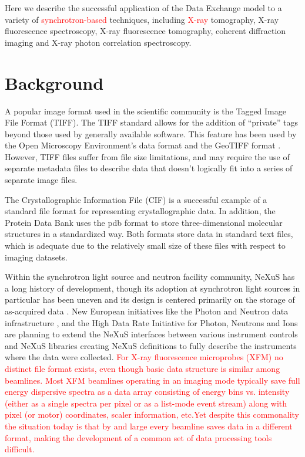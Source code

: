 \documentclass[pdf]{iucr}              %
\begin{document}
Here we describe the successful application of the Data Exchange model to a variety of \textcolor{red}{synchrotron-based} techniques, including \textcolor{red}{X-ray} tomography, X-ray fluorescence spectroscopy, X-ray fluorescence tomography, coherent diffraction imaging and X-ray photon correlation spectroscopy.

\section{Background}

A popular image format used in the scientific community is the Tagged Image File Format (TIFF). The TIFF standard allows for the addition of ``private'' tags beyond those used by generally available software. This feature has been used by the Open Microscopy Environment's data format \cite{OME-TIFF} and the GeoTIFF format \cite{GeoTIFF}. However, TIFF files suffer from file size limitations, and may require the use of separate metadata files to describe data that doesn't logically fit into a series of separate image files.

The Crystallographic Information File (CIF) is a successful example of a standard file format for representing crystallographic data. In addition, the Protein Data Bank uses the pdb format \cite{pdb} to store three-dimensional molecular structures in a standardized way. Both formats store data in standard text files, which is adequate due to the relatively small size of these files with respect to imaging datasets.

Within the synchrotron light source and neutron facility community, NeXuS \cite{Tischler1984} has a long history of development, though its adoption at synchrotron light sources in particular has been uneven and its design is centered primarily on the storage of as-acquired data \cite{NeXuS}. New European initiatives like the Photon and Neutron data infrastructure \cite{PanData_2013}, and the High Data Rate Initiative for Photon, Neutrons and Ions \cite{PNI_HDRI_2013} are
planning to extend the NeXuS interfaces between various instrument controls and NeXuS libraries creating NeXuS definitions to fully describe the instruments where the data were collected. 
\textcolor{red}{For X-ray fluorescence microprobes (XFM) no distinct file format exists, even though basic data structure is similar among beamlines. Most XFM beamlines operating in an imaging mode typically save full energy dispersive spectra as a data array consisting of energy bins vs. intensity (either as a single spectra per pixel or as a list-mode event stream) along with pixel (or motor) coordinates, scaler information, etc.Yet despite this commonality the situation today is that by and large every beamline saves data in a different format, making the development of a common set of data processing tools difficult.} 
\end{document}
